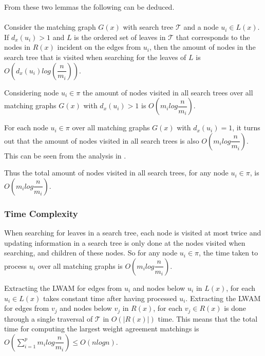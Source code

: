 From these two lemmas the following can be deduced.
\\
\\
Consider the matching graph $G(x)$ with search tree $\mathcal{T}$ and a node $u_i \in L(x)$. If $d_x(u_i) > 1$ and $L$ is the ordered set of leaves in $\mathcal{T}$ that corresponds to the nodes in $R(x)$ incident on the edges from $u_i$, then the amount of nodes in the search tree that is visited when searching for the leaves of $L$ is $O(d_x(u_i)log(\dfrac{n}{m_i}))$.

Considering node $u_i \in \pi$ the amount of nodes visited in all search trees over all matching graphs $G(x)$ with $d_x(u_i) > 1$ is $O(m_ilog\dfrac{n}{m_i})$.

For each node $u_i \in \pi$ over all matching graphs $G(x)$ with $d_x(u_i) = 1$, it turns out that the amount of nodes visited in all search trees is also $O(m_ilog\dfrac{n}{m_i})$. This can be seen from the analysis in \cite{nlogn}.

Thus the total amount of nodes visited in all search trees, for any node $u_i \in \pi$, is $O(m_ilog\dfrac{n}{m_i})$.

\subsubsection{Time Complexity}
When searching for leaves in a search tree, each node is visited at most twice and updating information in a search tree is only done at the nodes visited when searching, and children of these nodes. So for any node $u_i \in \pi$, the time taken to process $u_i$ over all matching graphs is $O(m_ilog\dfrac{n}{m_i})$.

Extracting the LWAM for edges from $u_i$ and nodes below $u_i$ in $L(x)$, for each $u_i \in L(x)$ takes constant time after having processed $u_i$. Extracting the LWAM for edges from $v_j$ and nodes below $v_j$ in $R(x)$, for each $v_j \in R(x)$ is done through a single traversal of $\mathcal{T}$ in $O(|R(x)|)$ time. This means that the total time for computing the largest weight agreement matchings is $O(\sum_{i=1}^p m_ilog\dfrac{n}{m_i}) \le O(nlogn)$.